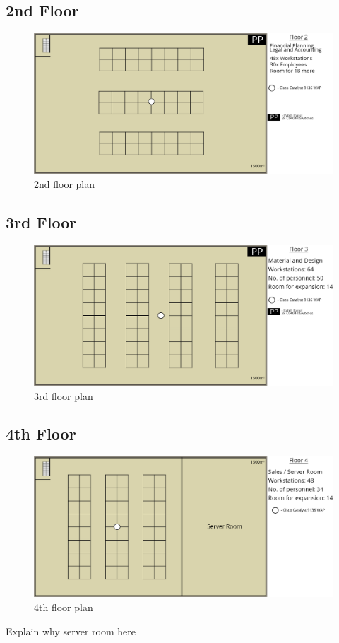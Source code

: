 \subsection{2nd Floor}
\begin{figure}[H]
    \includegraphics[width=15cm]{Figures/2nd-floor.png}
    \caption{2nd floor plan}
    \label{fig:2nd_floor}
\end{figure}
\subsection{3rd Floor}
\begin{figure}[H]
    \includegraphics[width=15cm]{Figures/3rd-Floor.png}
    \caption{3rd floor plan}
    \label{fig:3rd_floor}
\end{figure}
\subsection{4th Floor}
\begin{figure}[H]
    \includegraphics[width=15cm]{Figures/4th-Floor.png}
    \caption{4th floor plan}
    \label{fig:4th_floor}
\end{figure}
Explain why server room here
